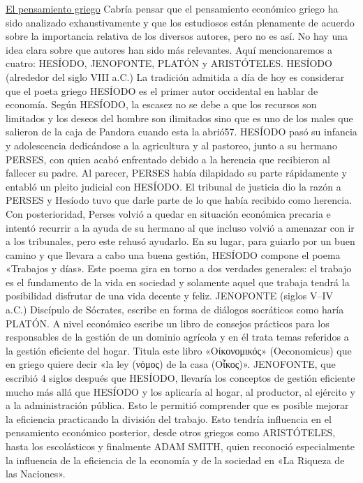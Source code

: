 \documentclass[10pt,a4paper]{article}
\begin{document}
\underline{El pensamiento griego}
Cabría pensar que el pensamiento económico griego ha sido analizado exhaustivamente y que los estudiosos están plenamente de acuerdo sobre la importancia relativa de los diversos autores, pero no es así. No hay una idea clara sobre que autores han sido más relevantes. Aquí mencionaremos a cuatro: HESÍODO, JENOFONTE, PLATÓN y ARISTÓTELES.
HESÍODO (alrededor del siglo VIII a.C.)
La tradición admitida a día de hoy es considerar que el poeta griego HESÍODO es el primer autor occidental en hablar de economía. Según HESÍODO, la escasez no se debe a que los recursos son limitados y los deseos del hombre son ilimitados sino que es uno de los males que salieron de la caja de Pandora cuando esta la abrió57. HESÍODO pasó su infancia y adolescencia dedicándose a la agricultura y al pastoreo, junto a su hermano PERSES, con quien acabó enfrentado debido a la herencia que recibieron al fallecer su padre. Al parecer, PERSES había dilapidado su parte rápidamente y entabló un pleito judicial con HESÍODO. El tribunal de justicia dio la razón a PERSES y Hesíodo tuvo que darle parte de lo que había recibido como herencia. Con posterioridad, Perses volvió a quedar en situación económica precaria e intentó recurrir a la ayuda de su hermano al que incluso volvió a amenazar con ir a los tribunales, pero este rehusó ayudarlo. En su lugar, para guiarlo por un buen camino y que llevara a cabo una buena gestión, HESÍODO compone el poema «Trabajos y días». Este poema gira en torno a dos verdades generales: el trabajo es el fundamento de la vida en sociedad y solamente aquel que trabaja tendrá la posibilidad disfrutar de una vida decente y feliz.
JENOFONTE (siglos V–IV a.C.)
Discípulo de Sócrates, escribe en forma de diálogos socráticos como haría PLATÓN. A nivel económico escribe un libro de consejos prácticos para los responsables de la gestión de un dominio agrícola y en él trata temas referidos a la gestión eficiente del hogar. Titula este libro «Οίκονομικός» (Oeconomicus) que en griego quiere decir «la ley (νόμος) de la casa (Οἶκος)». JENOFONTE, que escribió 4 siglos después que HESÍODO, llevaría los conceptos de gestión eficiente mucho más allá que HESÍODO y los aplicaría al hogar, al productor, al ejército y a la administración pública. Esto le permitió comprender que es posible mejorar la eficiencia practicando la división del trabajo. Esto tendría influencia en el pensamiento económico posterior, desde otros griegos como ARISTÓTELES, hasta los escolásticos y finalmente ADAM SMITH, quien reconoció especialmente la influencia de la eficiencia de la economía y de la sociedad en «La Riqueza de las Naciones».
\end{document}
